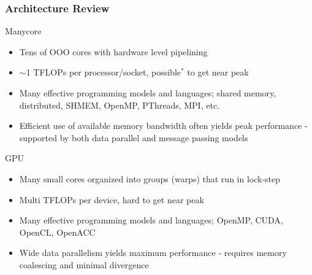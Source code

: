 \documentclass{beamer}
\begin{document}
\begin{frame}
  \frametitle{Architecture Review}
  Manycore
  \begin{itemize}
    \item Tens of OOO cores with hardware level pipelining
    \item $\sim$1 TFLOPs per processor/socket, possible$^{*}$ to get near
      peak
    \item Many effective programming models and languages; shared memory,
      distributed, SHMEM, OpenMP, PThreads, MPI, etc.
    \item Efficient use of available memory bandwidth often yields peak performance - 
      supported by both data parallel and message passing models
  \end{itemize}
  GPU
  \begin{itemize}
    \item Many small cores organized into groups (warps) that run in lock-step
    \item Multi TFLOPs per device, hard to get near peak
    \item Many effective programming models and languages; OpenMP, CUDA, OpenCL,
      OpenACC
    \item Wide data parallelism yields maximum performance - requires memory
      coalescing and minimal divergence
  \end{itemize}
\end{frame}
\end{document}
